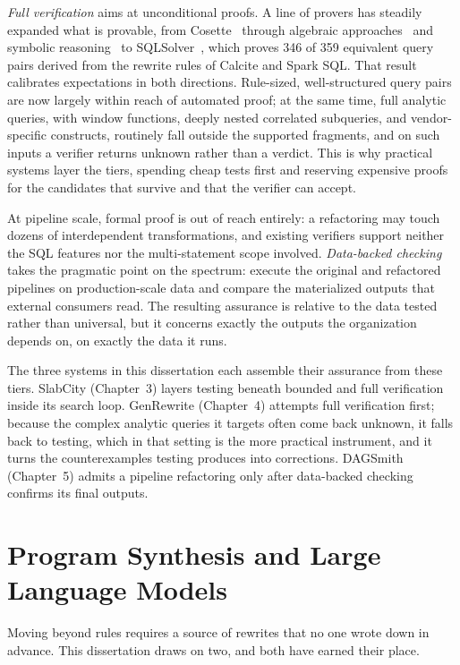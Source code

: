 \emph{Full verification} aims at unconditional proofs. A line of
provers has steadily expanded what is provable, from
Cosette~\cite{chu2017cosette} through algebraic
approaches~\cite{chu2018axiomatic} and symbolic
reasoning~\cite{zhou2022spes} to SQLSolver~\cite{ding2023proving},
which proves 346 of 359 equivalent query pairs derived from the
rewrite rules of Calcite and Spark SQL. That result calibrates
expectations in both directions. Rule-sized, well-structured query
pairs are now largely within reach of automated proof; at the same
time, full analytic queries, with window functions, deeply nested
correlated subqueries, and vendor-specific constructs, routinely
fall outside the supported fragments, and on such inputs a verifier
returns unknown rather than a verdict. This is why practical
systems layer the tiers, spending cheap tests first and reserving
expensive proofs for the candidates that survive and that the
verifier can accept.

At pipeline scale, formal proof is out of reach entirely: a
refactoring may touch dozens of interdependent transformations, and
existing verifiers support neither the SQL features nor the
multi-statement scope involved. \emph{Data-backed checking} takes
the pragmatic point on the spectrum: execute the original and
refactored pipelines on production-scale data and compare the
materialized outputs that external consumers read. The resulting
assurance is relative to the data tested rather than universal, but
it concerns exactly the outputs the organization depends on, on
exactly the data it runs.

The three systems in this dissertation each assemble their
assurance from these tiers. SlabCity (Chapter~3) layers testing
beneath bounded and full verification inside its search loop.
GenRewrite (Chapter~4) attempts full verification first; because
the complex analytic queries it targets often come back unknown, it
falls back to testing, which in that setting is the more practical
instrument, and it turns the counterexamples testing produces into
corrections. DAGSmith (Chapter~5) admits a pipeline refactoring
only after data-backed checking confirms its final outputs.

\section{Program Synthesis and Large Language Models}
\label{sec:bg:tools}

Moving beyond rules requires a source of rewrites that no one wrote
down in advance. This dissertation draws on two, and both have
earned their place.

